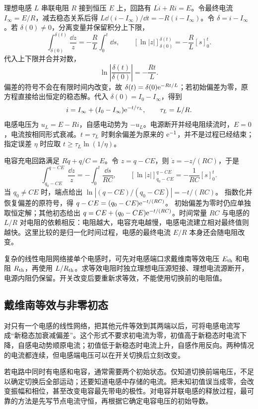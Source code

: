 理想电感 $L$ 串联电阻 $R$ 接到恒压 $E$ 上，回路有 $L\dot i+Ri=E$。令最终电流 $I_\infty=E/R$，减去稳态关系后得 $L\dd(i-I_\infty)/\dd t=-R(i-I_\infty)$。令 $\delta=i-I_\infty$。若 $\delta(0)\ne0$，分离变量并保留积分上下限，
\[
\int_{\delta(0)}^{\delta(t)}\frac{\dd z}{z}
 =-\frac RL\int_0^t\dd s,\qquad
 [\ln|z|]_{\delta(0)}^{\delta(t)}=-\frac RL[s]_0^t.
\]
代入上下限并合并对数，
\[
\ln\left|\frac{\delta(t)}{\delta(0)}\right|=-\frac{Rt}{L}.
\]
偏差的符号不会在有限时间内改变，故 $\delta(t)=\delta(0)\mathrm e^{-Rt/L}$；若初始偏差为零，原方程直接给出恒定的稳态解。代入 $\delta(0)=I_0-I_\infty$，得到
\[i=I_\infty+(I_0-I_\infty)\mathrm e^{-t/\tau_L},\qquad\tau_L=L/R.\]
电感电压为 $u_L=E-Ri$，自感电动势为 $-u_L$。电源断开并经电阻续流时，$E=0$，电流按相同形式衰减。$t=\tau_L$ 时剩余偏差为原来的 $\mathrm e^{-1}$，并不是过程已经结束；指定误差 $\eta$ 时应取 $t\ge\tau_L\ln(1/\eta)$。

电容充电回路满足 $R\dot q+q/C=E$。令 $z=q-CE$，则 $\dot z=-z/(RC)$，于是
\[
\int_{q_0-CE}^{q-CE}\frac{\dd z}{z}
 =-\int_0^t\frac{\dd s}{RC},\qquad
 [\ln|z|]_{q_0-CE}^{q-CE}=-\frac1{RC}[s]_0^t.
\]
当 $q_0\ne CE$ 时，端点给出 $\ln|(q-CE)/(q_0-CE)|=-t/(RC)$。
指数化并恢复偏差的原符号，得 $q-CE=(q_0-CE)\mathrm e^{-t/(RC)}$。
初始偏差为零时仍应单独取恒定解；其他初态给出 $q=CE+(q_0-CE)\mathrm e^{-t/(RC)}$。时间常量 $RC$ 与电感的 $L/R$ 对电阻的依赖相反：电阻越大，电容充电越慢，电感电流建立相对最终值则越快。这里比较的是归一化时间过程，电感的最终电流 $E/R$ 本身还会随电阻改变。



复杂的线性电阻网络接单个电感时，可先对电感端口求戴维南等效电压 $E_{\rm th}$ 和电阻 $R_{\rm th}$，再使用 $L/R_{\rm th}$。求等效电阻时独立理想电压源短接、理想电流源断开，电源内阻仍保留。开关改变后要重新求等效，不能使用切换前的电阻值。


\subsection{戴维南等效与非零初态}

对只有一个电感的线性网络，把其他元件等效到其两端以后，可将电感电流写成“新稳态加衰减偏差”。这个形式不要求初电流为零，初值高于新稳态时电流下降，自感电动势顺原电流；初值低于新稳态时电流上升，自感作用反向。两种情况的电流都连续，但电感端电压可以在开关切换后立刻改变。

若电路中同时有电感和电容，通常需要两个初始状态。仅知道切换前端电压，不足以确定切换后全部运动；还要知道电感中存储的电流。把未知初值误当成零，会改变振幅和相位，甚至改变电容最先带电的极性。对电容并联电感的释放过程，最可靠的方法是先写节点电流守恒，再根据它确定电容电压的初始导数。


